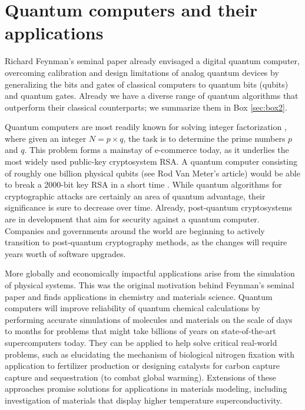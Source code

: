 \documentclass[journal]{IEEEtran}
\begin{document}
\section{Quantum computers and their applications}

Richard Feynman's seminal paper already envisaged a digital quantum computer, overcoming calibration and design limitations of analog quantum devices by generalizing the bits and gates of classical computers to quantum bits (qubits) and quantum gates. Already we have a diverse range of quantum algorithms that outperform their classical counterparts; we summarize them in Box \ref{sec:box2}.

Quantum computers are most readily known for solving integer factorization \cite{Shor1994}, where given an integer $N=p\times q$, the task is to determine the prime numbers $p$ and $q$.  This problem forms a mainstay of e-commerce today, as it underlies the most widely used public-key cryptosystem RSA.  A quantum computer consisting of roughly one billion physical qubits {\color{red}(see Rod Van Meter's article)} would be able to break a 2000-bit key RSA in a short time \cite{}.  While quantum algorithms for cryptographic attacks are certainly an area of quantum advantage, their significance is sure to decrease over time.  Already, post-quantum cryptosystems are in development that aim for security against a quantum computer.  Companies and governments around the world are beginning to actively transition to post-quantum cryptography methods, as the changes will require years worth of software upgrades.  

More globally and economically impactful applications arise from the simulation of physical systems. This was the original motivation behind Feynman's seminal paper and finds applications in chemistry and materials science. Quantum computers will improve reliability of quantum chemical calculations by performing accurate simulations of molecules and materials on the scale of days to months for problems that might take billions of years on state-of-the-art supercomputers today. They can be applied to help solve critical real-world problems, such as elucidating the mechanism of biological nitrogen fixation with application to fertilizer production or designing catalysts for carbon capture  capture and sequestration (to combat global warming).  Extensions of these approaches promise solutions for applications in materials modeling, including investigation of materials that display higher temperature superconductivity. 
\end{document}
